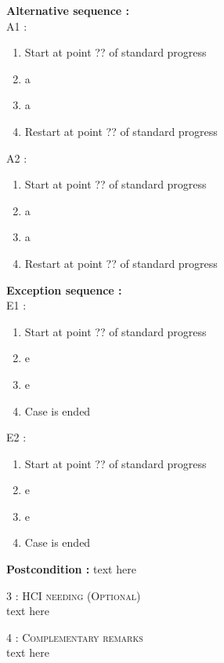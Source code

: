 \begin{flushleft}
    \textbf{\large  Alternative sequence :}\\
    A1 : 
    \begin{enumerate}[nosep]
        \item[] Start at point ?? of standard progress
        \item a	
        \item a	
        \item Restart at point ?? of standard progress
    \end{enumerate}


    A2 :
    \begin{enumerate}[nosep]
        \item[] Start at point ?? of standard progress
        \item a	
        \item a	
        \item Restart at point ?? of standard progress
    \end{enumerate}

    \textbf{\large  Exception sequence :}\\
    E1 :
    \begin{enumerate}[nosep]
        \item[] Start at point ?? of standard progress
        \item e
        \item e
        \item Case is ended
    \end{enumerate}
    E2 :
    \begin{enumerate}[nosep]
        \item[] Start at point ?? of standard progress
        \item e
        \item e
        \item Case is ended
    \end{enumerate}

    \textbf{\large Postcondition :} text here

    \BlackLine
    \textsc{\Large 3 : HCI needing (Optional)}\\[0.3cm]

    text here

    \BlackLine
    \textsc{\Large 4 : Complementary remarks}\\[0.3cm]

    text here	

\end{flushleft}
